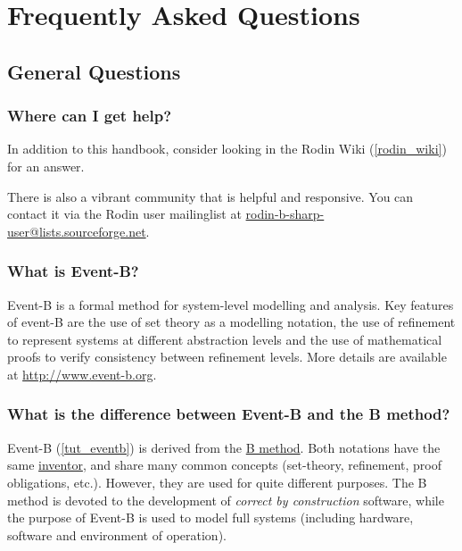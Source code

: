 \chapter{Frequently Asked Questions}
\label{faq}

\section{General Questions}

\subsection{Where can I get help?}
\label{faq_getting_help}

In addition to this handbook, consider looking in the Rodin Wiki (\ref{rodin_wiki}) for an answer.

There is also a vibrant community that is helpful and responsive.  You can contact it via the Rodin user mailinglist at \href{mailto:rodin-b-sharp-user@lists.sourceforge.net}{rodin-b-sharp-user@lists.sourceforge.net}.

\subsection{What is Event-B?}

Event-B is a formal method for system-level modelling and analysis. Key features of event-B are the use of set theory as a modelling notation, the use of refinement to represent systems at different abstraction levels and the use of mathematical proofs to verify consistency between refinement levels.
More details are available at \url{http://www.event-b.org}.

\subsection{What is the difference between Event-B and the B method?}

Event-B (\ref{tut_eventb}) is derived from the \href{http://en.wikipedia.org/wiki/B-Method}{B method}. Both notations have the same \href{http://en.wikipedia.org/wiki/Jean-Raymond_Abrial}{inventor}, and share many common concepts (set-theory, refinement, proof obligations, etc.). However, they are used for quite different purposes. The B method is devoted to the development of \textit{correct by construction} software, while the purpose of Event-B is used to model full systems (including hardware, software and environment of operation).

